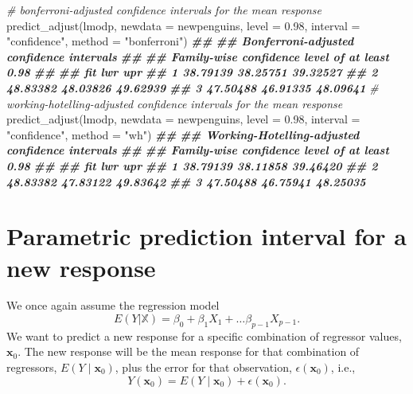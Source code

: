 \documentclass[
]{book}
\newenvironment{Shaded}{\begin{snugshade}}{\end{snugshade}}
\newcommand{\AttributeTok}[1]{\textcolor[rgb]{0.77,0.63,0.00}{#1}}
\newcommand{\CommentTok}[1]{\textcolor[rgb]{0.56,0.35,0.01}{\textit{#1}}}
\newcommand{\DocumentationTok}[1]{\textcolor[rgb]{0.56,0.35,0.01}{\textbf{\textit{#1}}}}
\newcommand{\FloatTok}[1]{\textcolor[rgb]{0.00,0.00,0.81}{#1}}
\newcommand{\FunctionTok}[1]{\textcolor[rgb]{0.00,0.00,0.00}{#1}}
\newcommand{\NormalTok}[1]{#1}
\newcommand{\StringTok}[1]{\textcolor[rgb]{0.31,0.60,0.02}{#1}}
\theoremstyle{definition}
\theoremstyle{definition}
\theoremstyle{definition}
\theoremstyle{definition}
\theoremstyle{remark}
\begin{document}
\begin{Shaded}
\begin{Highlighting}[]
\CommentTok{\# bonferroni{-}adjusted confidence intervals for the mean response}
\FunctionTok{predict\_adjust}\NormalTok{(lmodp, }\AttributeTok{newdata =}\NormalTok{ newpenguins, }\AttributeTok{level =} \FloatTok{0.98}\NormalTok{,}
               \AttributeTok{interval =} \StringTok{"confidence"}\NormalTok{, }\AttributeTok{method =} \StringTok{"bonferroni"}\NormalTok{)}
\DocumentationTok{\#\# }
\DocumentationTok{\#\# Bonferroni{-}adjusted confidence intervals}
\DocumentationTok{\#\# }
\DocumentationTok{\#\# Family{-}wise confidence level of at least 0.98 }
\DocumentationTok{\#\# }
\DocumentationTok{\#\#        fit      lwr      upr}
\DocumentationTok{\#\# 1 38.79139 38.25751 39.32527}
\DocumentationTok{\#\# 2 48.83382 48.03826 49.62939}
\DocumentationTok{\#\# 3 47.50488 46.91335 48.09641}
\CommentTok{\# working{-}hotelling{-}adjusted confidence intervals for the mean response}
\FunctionTok{predict\_adjust}\NormalTok{(lmodp, }\AttributeTok{newdata =}\NormalTok{ newpenguins, }\AttributeTok{level =} \FloatTok{0.98}\NormalTok{,}
               \AttributeTok{interval =} \StringTok{"confidence"}\NormalTok{, }\AttributeTok{method =} \StringTok{"wh"}\NormalTok{)}
\DocumentationTok{\#\# }
\DocumentationTok{\#\# Working{-}Hotelling{-}adjusted confidence intervals}
\DocumentationTok{\#\# }
\DocumentationTok{\#\# Family{-}wise confidence level of at least 0.98 }
\DocumentationTok{\#\# }
\DocumentationTok{\#\#        fit      lwr      upr}
\DocumentationTok{\#\# 1 38.79139 38.11858 39.46420}
\DocumentationTok{\#\# 2 48.83382 47.83122 49.83642}
\DocumentationTok{\#\# 3 47.50488 46.75941 48.25035}
\end{Highlighting}
\end{Shaded}

\hypertarget{pi-new-response}{%
\section{Parametric prediction interval for a new response}\label{pi-new-response}}

We once again assume the regression model
\[
E(Y|\mathbb{X})=\beta_0+\beta_1 X_1 + \ldots \beta_{p-1} X_{p-1}.
\]
We want to predict a new response for a specific combination of regressor values, \(\mathbf{x}_0\). The new response will be the mean response for that combination of regressors, \(E(Y\mid \mathbf{x}_0)\), plus the error for that observation, \(\epsilon(\mathbf{x}_0)\), i.e.,
\[
Y(\mathbf{x}_0)=E(Y\mid \mathbf{x}_0) + \epsilon(\mathbf{x}_0).
\]
\end{document}
